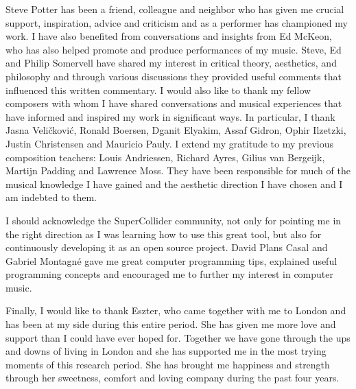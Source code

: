 Steve Potter has been a friend, colleague and neighbor who has given me crucial support, inspiration, advice and criticism and as a performer has championed my work. I have also benefited from conversations and insights from Ed McKeon, who has also helped promote and produce performances of my music. Steve, Ed and Philip Somervell have shared my interest in critical theory, aesthetics, and philosophy and through various discussions they provided useful comments that influenced this written commentary. I would also like to thank my fellow composers with whom I have shared conversations and musical experiences that have informed and inspired my work in significant ways. In particular, I thank Jasna Veli\v{c}kovi\'{c}, Ronald Boersen, Dganit Elyakim, Assaf Gidron, Ophir Ilzetzki, Justin Christensen and Mauricio Pauly. I extend my gratitude to my previous composition teachers: Louis Andriessen, Richard Ayres, Gilius van Bergeijk, Martijn Padding and Lawrence Moss. They have been responsible for much of the musical knowledge I have gained and the aesthetic direction I have chosen and I am indebted to them.

I should acknowledge the SuperCollider community, not only for pointing me in the right direction as I was learning how to use this great tool, but also for continuously developing it as an open source project. David Plans Casal and Gabriel Montagn\'e gave me great computer programming tips, explained useful programming concepts and encouraged me to further my interest in computer music.

Finally, I would like to thank Eszter, who came together with me to London and has been at my side during this entire period. She has given me more love and support than I could have ever hoped for. Together we have gone through the ups and downs of living in London and she has supported me in the most trying moments of this research period. She has brought me happiness and strength through her sweetness, comfort and loving company during the past four years.  
